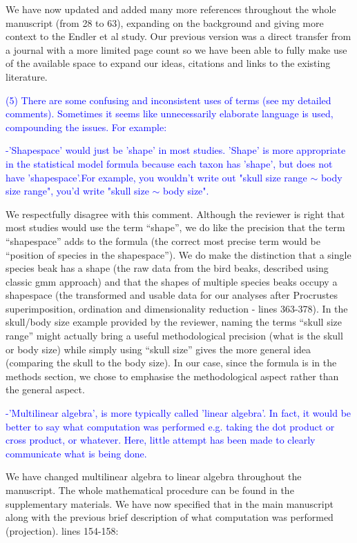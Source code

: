 \documentclass[12pt,letterpaper]{article}
\begin{document}
{We have now updated and added many more references throughout the whole manuscript (from 28 to 63), expanding on the background and giving more context to the Endler et al study. Our previous version was a direct transfer from a journal with a more limited page count so we have been able to fully make use of the available space to expand our ideas, citations and links to the existing literature.


\textcolor{blue}{(5) There are some confusing and inconsistent uses of terms (see my detailed comments). Sometimes it seems like unnecessarily elaborate language is used, compounding the issues. For example:}

\textcolor{blue}{ -'Shapespace' would just be 'shape' in most studies. 'Shape' is more appropriate in the statistical model formula because each taxon has 'shape', but does not have 'shapespace'.For example, you wouldn't write out "skull size range $\sim$ body size range", you'd write "skull size $\sim$ body size".}

We respectfully disagree with this comment. Although the reviewer is right that most studies would use the term “shape”, we do like the precision that the term “shapespace” adds to the formula (the correct most precise term would be “position of species in the shapespace”). 
We do make the distinction that a single species beak has a shape (the raw data from the bird beaks, described using classic gmm approach) and that the shapes of multiple species beaks occupy a shapespace (the transformed and usable data for our analyses after Procrustes superimposition, ordination and dimensionality reduction - lines 363-378). In the skull/body size example provided by the reviewer, naming the terms “skull size range” might actually bring a useful methodological precision (what is the skull or body size) while simply using “skull size” gives the more general idea (comparing the skull to the body size). In our case, since the formula is in the methods section, we chose to emphasise the methodological aspect rather than the general aspect.

\textcolor{blue}{-'Multilinear algebra', is more typically called 'linear algebra'. In fact, it would be better to say what computation was performed e.g. taking the dot product or cross product, or whatever. Here, little attempt has been made to clearly communicate what is being done.}

We have changed multilinear algebra to linear algebra throughout the manuscript. The whole mathematical procedure can be found in the supplementary materials. We have now specified that in the main manuscript along with the previous brief description of what computation was performed (projection). lines 154-158:

}
\end{document}
